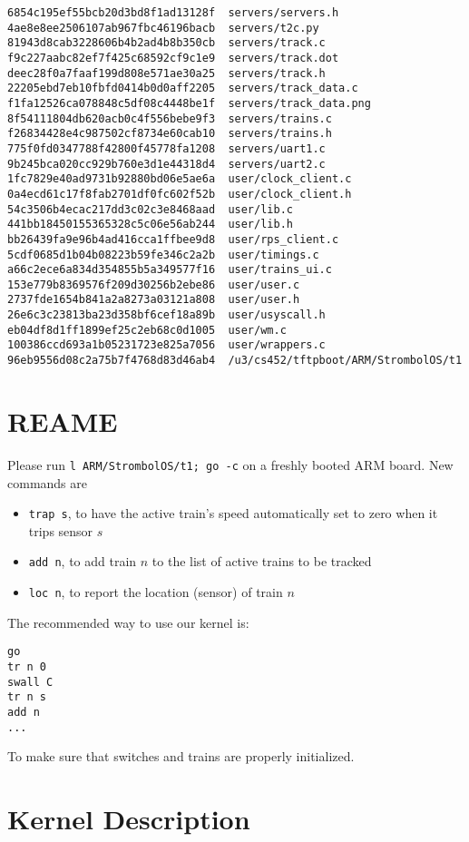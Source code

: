 \documentclass{article}
\begin{document}
\begin{verbatim}
6854c195ef55bcb20d3bd8f1ad13128f  servers/servers.h
4ae8e8ee2506107ab967fbc46196bacb  servers/t2c.py
81943d8cab3228606b4b2ad4b8b350cb  servers/track.c
f9c227aabc82ef7f425c68592cf9c1e9  servers/track.dot
deec28f0a7faaf199d808e571ae30a25  servers/track.h
22205ebd7eb10fbfd0414b0d0aff2205  servers/track_data.c
f1fa12526ca078848c5df08c4448be1f  servers/track_data.png
8f54111804db620acb0c4f556bebe9f3  servers/trains.c
f26834428e4c987502cf8734e60cab10  servers/trains.h
775f0fd0347788f42800f45778fa1208  servers/uart1.c
9b245bca020cc929b760e3d1e44318d4  servers/uart2.c
1fc7829e40ad9731b92880bd06e5ae6a  user/clock_client.c
0a4ecd61c17f8fab2701df0fc602f52b  user/clock_client.h
54c3506b4ecac217dd3c02c3e8468aad  user/lib.c
441bb18450155365328c5c06e56ab244  user/lib.h
bb26439fa9e96b4ad416cca1ffbee9d8  user/rps_client.c
5cdf0685d1b04b08223b59fe346c2a2b  user/timings.c
a66c2ece6a834d354855b5a349577f16  user/trains_ui.c
153e779b8369576f209d30256b2ebe86  user/user.c
2737fde1654b841a2a8273a03121a808  user/user.h
26e6c3c23813ba23d358bf6cef18a89b  user/usyscall.h
eb04df8d1ff1899ef25c2eb68c0d1005  user/wm.c
100386ccd693a1b05231723e825a7056  user/wrappers.c
96eb9556d08c2a75b7f4768d83d46ab4  /u3/cs452/tftpboot/ARM/StrombolOS/t1
\end{verbatim}

\section{REAME}
Please run
\texttt{l ARM/StrombolOS/t1; go -c} on a freshly booted ARM board.
New commands are
\begin{itemize}
\item \texttt{trap s}, to have the active train's speed automatically set to
zero when it trips sensor $s$
\item \texttt{add n}, to add train $n$ to the list of active trains to be
tracked
\item \texttt{loc n}, to report the location (sensor) of train $n$
\end{itemize}
The recommended way to use our kernel is:
\begin{verbatim}
go
tr n 0
swall C
tr n s
add n
...
\end{verbatim}
To make sure that switches and trains are properly initialized.

\section{Kernel Description}
\end{document}
